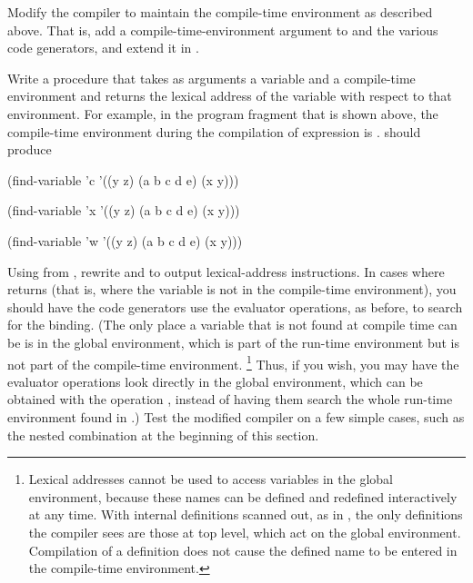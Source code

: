 \begin{exercise}
	\label{Exercise 5.40}
	Modify the compiler to maintain the compile-time environment as described above.
	That is, add a compile-time-environment argument to  and the various code generators, and extend it in .
\end{exercise}



\begin{exercise}
	\label{Exercise 5.41}
	Write a procedure  that takes as arguments a variable and a compile-time environment and returns the lexical address of the variable with respect to that environment.
	For example, in the program fragment that is shown above, the compile-time environment during the compilation of expression  is .
	 should produce

	\begin{scheme}
	  (find-variable 'c '((y z) (a b c d e) (x y)))
	  ~~

	  (find-variable 'x '((y z) (a b c d e) (x y)))
	  ~~

	  (find-variable 'w '((y z) (a b c d e) (x y)))
	  ~~
	\end{scheme}
\end{exercise}



\begin{exercise}
	\label{Exercise 5.42}
	Using  from , rewrite  and  to output lexical-address instructions.
	In cases where  returns  (that is, where the variable is not in the compile-time environment), you should have the code generators use the evaluator operations, as before, to search for the binding.
	(The only place a variable that is not found at compile time can be is in the global environment, which is part of the run-time environment but is not part of the compile-time environment.%
	\footnote{
		Lexical addresses cannot be used to access variables in the global environment, because these names can be defined and redefined interactively at any time.
		With internal definitions scanned out, as in , the only definitions the compiler sees are those at top level, which act on the global environment.
		Compilation of a definition does not cause the defined name to be entered in the compile-time environment.
	}
	Thus, if you wish, you may have the evaluator operations look directly in the global environment, which can be obtained with the operation , instead of having them search the whole run-time environment found in .)
	Test the modified compiler on a few simple cases, such as the nested  combination at the beginning of this section.
\end{exercise}



